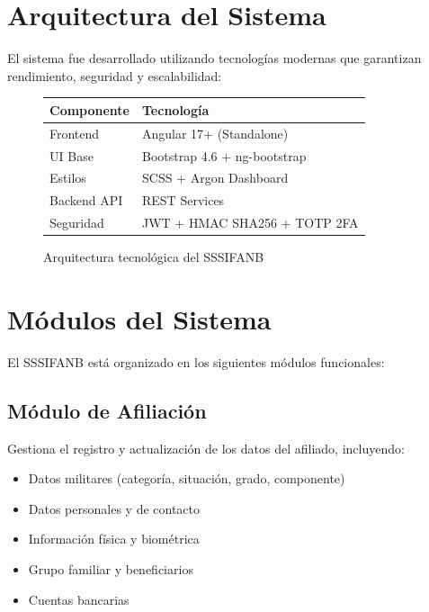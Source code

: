 \section{Arquitectura del Sistema}

El sistema fue desarrollado utilizando tecnologías modernas que garantizan rendimiento, seguridad y escalabilidad:

\begin{figure}[H]
\centering
\begin{tcolorbox}[
    enhanced,
    colback=white,
    colframe=sandraDark,
    width=0.85\textwidth,
    halign=center
]
\begin{tabular}{p{4cm}p{5cm}}
\toprule
\textbf{Componente} & \textbf{Tecnología} \\
\midrule
Frontend & Angular 17+ (Standalone) \\
UI Base & Bootstrap 4.6 + ng-bootstrap \\
Estilos & SCSS + Argon Dashboard \\
Backend API & REST Services \\
Seguridad & JWT + HMAC SHA256 + TOTP 2FA \\
\bottomrule
\end{tabular}
\end{tcolorbox}
\caption{Arquitectura tecnológica del SSSIFANB}
\label{fig:arquitectura}
\end{figure}

\section{Módulos del Sistema}

El SSSIFANB está organizado en los siguientes módulos funcionales:

\subsection{Módulo de Afiliación}

Gestiona el registro y actualización de los datos del afiliado, incluyendo:

\begin{itemize}[leftmargin=*]
    \item Datos militares (categoría, situación, grado, componente)
    \item Datos personales y de contacto
    \item Información física y biométrica
    \item Grupo familiar y beneficiarios
    \item Cuentas bancarias
\end{itemize}

